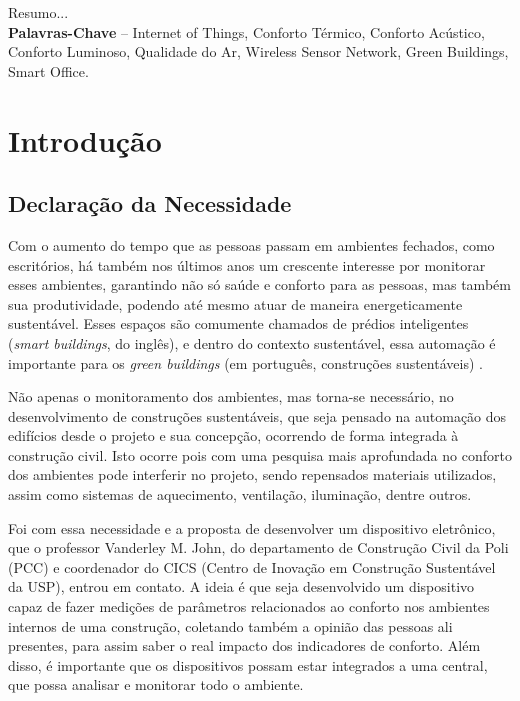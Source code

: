 \documentclass[]{politex}
\begin{document}
\capa
\folhaderosto


\begin{resumo}
Resumo...
%
\\[3\baselineskip]
%
\textbf{Palavras-Chave} -- Internet of Things, Conforto Térmico, Conforto Acústico, Conforto Luminoso, Qualidade do Ar, Wireless Sensor Network, Green Buildings, Smart Office.
\end{resumo}


\sumario



\part{Introdução}

\chapter{Declaração da Necessidade}

Com o aumento do tempo que as pessoas passam em ambientes fechados, como escritórios, há também nos últimos anos um crescente interesse por monitorar esses ambientes, garantindo não só saúde e conforto para as pessoas, mas também sua produtividade, podendo até mesmo atuar de maneira energeticamente sustentável. Esses espaços são comumente chamados de prédios inteligentes (\textit{smart buildings}, do inglês), e dentro do contexto sustentável, essa automação é importante para os \textit{green buildings} (em português, construções sustentáveis) \cite{GreenBuildings} \cite{EnergyBuildings}. 

Não apenas o monitoramento dos ambientes, mas torna-se necessário, no desenvolvimento de construções sustentáveis, que seja pensado na automação dos edifícios desde o projeto e sua concepção, ocorrendo de forma integrada à construção civil. Isto ocorre pois com uma pesquisa mais aprofundada no conforto dos ambientes pode interferir no projeto, sendo repensados materiais utilizados, assim como sistemas de aquecimento, ventilação, iluminação, dentre outros. 

Foi com essa necessidade e a proposta de desenvolver um dispositivo eletrônico, que o professor Vanderley M. John, do departamento de Construção Civil da Poli (PCC) e coordenador do CICS (Centro de Inovação em Construção Sustentável da USP)\cite{CICS}, entrou em contato. A ideia é que seja desenvolvido um dispositivo capaz de fazer medições de parâmetros relacionados ao conforto nos ambientes internos de uma construção, coletando também a opinião das pessoas ali presentes, para assim saber o real impacto dos indicadores de conforto. Além disso, é importante que os dispositivos possam estar integrados a uma central, que possa analisar e monitorar todo o ambiente. 
\end{document}
